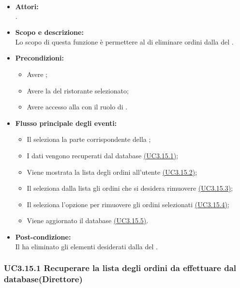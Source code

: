 \begin{itemize}
	\item \textbf{Attori:}
	\\.
	\item \textbf{Scopo e descrizione:} 
	\\Lo scopo di questa funzione è permettere al  di eliminare ordini dalla  del .
	\item \textbf{Precondizioni:}
	\begin{itemize}
		\item Avere ;
		\item Avere la  del ristorante selezionato;
		\item Avere accesso alla  con il ruolo di .
	\end{itemize}
	\item \textbf{Flusso principale degli eventi:}
	\begin{itemize}
		\item Il  seleziona la parte corrispondente della ;
		\item I dati vengono recuperati dal database \hyperref[UC3.15.1]{(UC3.15.1)};
		\item Viene mostrata la lista degli ordini all'utente \hyperref[UC3.15.2]{(UC3.15.2)};
		\item Il  seleziona dalla lista gli ordini che si desidera rimuovere \hyperref[UC3.15.3]{(UC3.15.3)};
		\item Il  seleziona l'opzione per rimuovere gli ordini selezionati \hyperref[UC3.15.4]{(UC3.15.4)};
		\item Viene aggiornato il database \hyperref[UC3.15.5]{(UC3.15.5)}.
	\end{itemize}
	\item \textbf{Post-condizione:}
	\\Il {} ha eliminato gli elementi desiderati dalla  del .
\end{itemize}

\subsubsection{UC3.15.1 Recuperare la lista degli ordini da effettuare dal database(Direttore)} \label{UC3.15.1}

